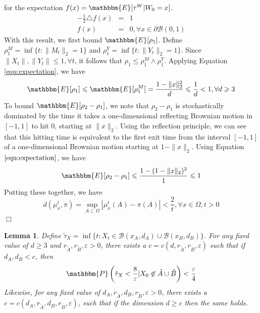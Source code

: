 \documentclass[english, aip, jcp, priprint, graphicx]{revtex4-1}
\newtheorem{lemma}{Lemma}
\theoremstyle{plain}
\theoremstyle{definition}
\theoremstyle{plain}
\begin{document}
for the expectation $f (x) =\mathbbm{E} [\tau^W |W_0 = x]$.
\begin{eqnarray*}
- \frac{1}{2} \triangle f (x) & = & 1\\
f (x) & = & 0, \forall x \in \partial \mathcal{B} (0, 1)
\end{eqnarray*}
With this result, we first bound $\mathbbm{E} [\rho_1]$. Define $\rho_1^M =
\inf \{ t : \| M_t \|_2 = 1 \}$ and $\rho_1^Y = \inf \{ t : \| Y_t \|_2 = 1
\}$. Since $\| X_t \|, \| Y_t \| \leqslant 1, \forall t$, it follows that
$\rho_1 \leqslant \rho_1^M \wedge \rho_1^Y$. Applying Equation
\ref{equ:expectation}, we have
\[ \mathbbm{E} [\rho_1] \leqslant \mathbbm{E} [\rho_1^M] = \frac{1 - \| x
\|^2_2}{d} \leqslant \frac{1}{d} < 1, \forall d \geqslant 3 \]
To bound $\mathbbm{E} [\rho_2 - \rho_1]$, we note that $\rho_2 - \rho_1$ is
stochastically dominated by the time it takes a one-dimensional reflecting
Brownian motion in $[- 1, 1]$ to hit $0$, starting at $\| x \|_2$. Using the
reflection principle, we can see that this hitting time is equivalent to the
first exit time from the interval $[- 1, 1]$ of a one-dimensional Brownian
motion starting at $1 - \| x \|^{}_2$. Using Equation $\ref{equ:expectation}$,
we have
\[ \mathbbm{E} [\rho_2 - \rho_1] \leqslant \frac{1 - (1 - \| x \|_2)^2}{1}
\leqslant 1 \]
Putting these together, we have
\[ d (\mu_x^t, \pi) = \sup_{A \subset \Omega} | \mu_x^t (A) - \pi (A) | <
\frac{2}{t}, \forall x \in \Omega, t > 0 \]
\hspace*{\fill}$\Box$\medskip

\begin{lemma}
\label{lem:longtime}Define $\tilde{\tau}_X = \inf \{ t : X_t \in \mathcal{B}
(x_A, d_A) \cup \mathcal{B} (x_B, d_B) \}$. For any fixed value of $d
\geqslant 3$ and $r_{\tilde{A}}, r_{\tilde{B}}, \varepsilon > 0$, there
exists a $c = c (d, r_{\tilde{A}}, r_{\tilde{B}}, \varepsilon)$ such that if
$d_A, d_B < c$, then
\[ \mathbbm{P} \left( \tilde{\tau}_X < \frac{8}{\varepsilon} |X_0 \not\in
\tilde{A} \cup \tilde{B} \right) < \frac{\varepsilon}{4} \]
Likewise, for any fixed value of $d_A, r_{\tilde{A}}, d_B, r_{\tilde{B}},
\varepsilon > 0$, there exists a $c = c (d_A, r_{\tilde{A}}, d_B,
r_{\tilde{B}}, \varepsilon)$, such that if the dimension $d \geqslant c$
then the same holds.
\end{lemma}
\end{document}
